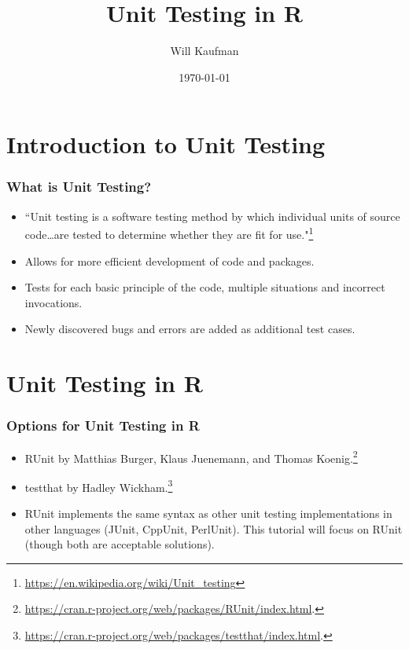 \documentclass{beamer}
\title{Unit Testing in R}
\author{Will Kaufman}
\date{\today}
\begin{document}
\frame{\titlepage}


\section{Introduction to Unit Testing}
\begin{frame}
\frametitle{What is Unit Testing?}

\begin{itemize}
\item ``Unit testing is a software testing method by which individual units of source code\ldots are tested to determine whether they are fit for use."\footnote{\url{https://en.wikipedia.org/wiki/Unit_testing}}
\item Allows for more efficient development of code and packages.
\item Tests for each basic principle of the code, multiple situations and incorrect invocations.
\item Newly discovered bugs and errors are added as additional test cases. 
\end{itemize}
\end{frame}

\section{Unit Testing in R}
\begin{frame}
	\frametitle{Options for Unit Testing in R}
	
	\begin{itemize}
	\item RUnit by Matthias Burger, Klaus Juenemann, and Thomas Koenig.\footnote{\url{https://cran.r-project.org/web/packages/RUnit/index.html}.}
	\item testthat by Hadley Wickham.\footnote{\url{https://cran.r-project.org/web/packages/testthat/index.html}.}
	\item RUnit implements the same syntax as other unit testing implementations in other languages (JUnit, CppUnit, PerlUnit). This tutorial will focus on RUnit (though both are acceptable solutions).
	\end{itemize}
\end{frame}
\end{document}
